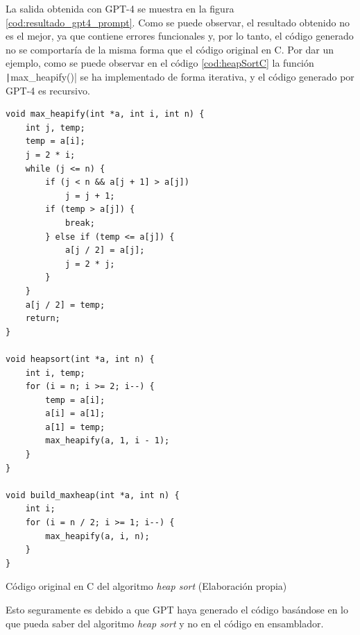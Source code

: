 La salida obtenida con GPT-4 se muestra en la figura \ref{cod:resultado_gpt4_prompt}. Como se puede
observar, el resultado obtenido no es el mejor, ya que contiene errores funcionales y, por lo tanto,
el código generado no se comportaría de la misma forma que el código original en C. Por dar un ejemplo,
como se puede observar en el código \ref{cod:heapSortC} la función \texttt|max_heapify()| se ha
implementado de forma iterativa, y el código generado por GPT-4 es recursivo.

\newpage
\begin{mycode}
    \begin{verbatim}
void max_heapify(int *a, int i, int n) {
    int j, temp;
    temp = a[i];
    j = 2 * i;
    while (j <= n) {
        if (j < n && a[j + 1] > a[j])
            j = j + 1;
        if (temp > a[j]) {
            break;
        } else if (temp <= a[j]) {
            a[j / 2] = a[j];
            j = 2 * j;
        }
    }
    a[j / 2] = temp;
    return;
}

void heapsort(int *a, int n) {
    int i, temp;
    for (i = n; i >= 2; i--) {
        temp = a[i];
        a[i] = a[1];
        a[1] = temp;
        max_heapify(a, 1, i - 1);
    }
}

void build_maxheap(int *a, int n) {
    int i;
    for (i = n / 2; i >= 1; i--) {
        max_heapify(a, i, n);
    }
}
    \end{verbatim}
    \caption[Código original en C del algoritmo \textit{heap sort}]{Código original en C del algoritmo \textit{heap sort} (Elaboración propia)}
    \label{cod:heapSortC}
\end{mycode}

Esto seguramente es debido a que GPT haya generado el código basándose en lo que pueda saber del algoritmo
\textit{heap sort} y no en el código en ensamblador.

